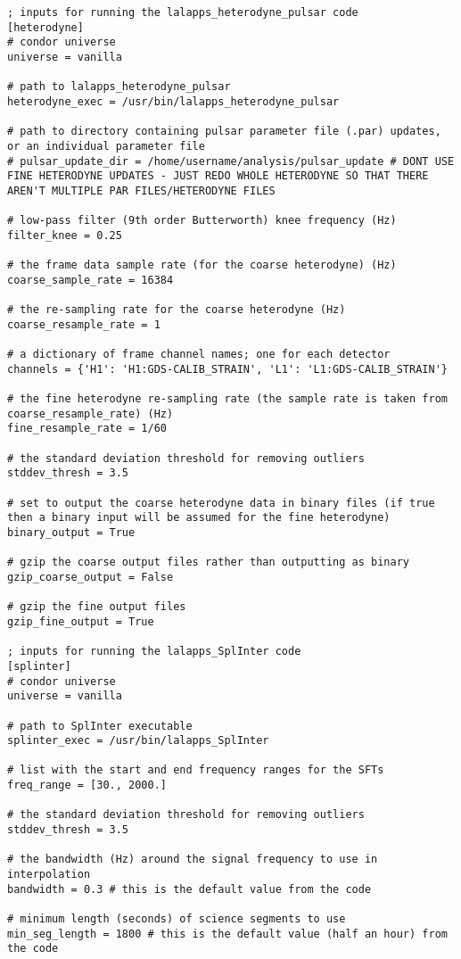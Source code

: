 \begin{lstlisting}[frame=single,basicstyle=\tiny\ttfamily]
; inputs for running the lalapps_heterodyne_pulsar code
[heterodyne]
# condor universe
universe = vanilla

# path to lalapps_heterodyne_pulsar
heterodyne_exec = /usr/bin/lalapps_heterodyne_pulsar

# path to directory containing pulsar parameter file (.par) updates, or an individual parameter file
# pulsar_update_dir = /home/username/analysis/pulsar_update # DONT USE FINE HETERODYNE UPDATES - JUST REDO WHOLE HETERODYNE SO THAT THERE AREN'T MULTIPLE PAR FILES/HETERODYNE FILES

# low-pass filter (9th order Butterworth) knee frequency (Hz)
filter_knee = 0.25

# the frame data sample rate (for the coarse heterodyne) (Hz)
coarse_sample_rate = 16384

# the re-sampling rate for the coarse heterodyne (Hz)
coarse_resample_rate = 1

# a dictionary of frame channel names; one for each detector
channels = {'H1': 'H1:GDS-CALIB_STRAIN', 'L1': 'L1:GDS-CALIB_STRAIN'}

# the fine heterodyne re-sampling rate (the sample rate is taken from coarse_resample_rate) (Hz)
fine_resample_rate = 1/60

# the standard deviation threshold for removing outliers
stddev_thresh = 3.5

# set to output the coarse heterodyne data in binary files (if true then a binary input will be assumed for the fine heterodyne)
binary_output = True

# gzip the coarse output files rather than outputting as binary
gzip_coarse_output = False

# gzip the fine output files
gzip_fine_output = True

; inputs for running the lalapps_SplInter code
[splinter]
# condor universe
universe = vanilla

# path to SplInter executable
splinter_exec = /usr/bin/lalapps_SplInter

# list with the start and end frequency ranges for the SFTs
freq_range = [30., 2000.]

# the standard deviation threshold for removing outliers
stddev_thresh = 3.5

# the bandwidth (Hz) around the signal frequency to use in interpolation
bandwidth = 0.3 # this is the default value from the code

# minimum length (seconds) of science segments to use
min_seg_length = 1800 # this is the default value (half an hour) from the code


\end{lstlisting}
